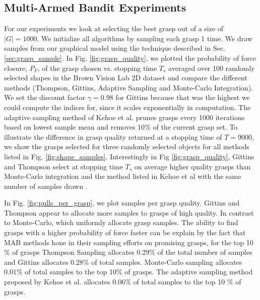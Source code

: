 \documentclass[journal,transmag]{IEEEtran}%
\begin{document}
\subsection{Multi-Armed Bandit Experiments}
For our experiments we look at selecting the best grasp out of a size of $|G| = 1000$. We initialize all algorithms by sampling each grasp 1 time. We draw samples from our graphical model using the technique described in Sec.  \ref{sec:grasp_sample}. In Fig. \ref{fig:grasp_quality}, we plotted the probability of force closure, $P_F$, of the grasp chosen vs. stopping time $T_s$ averaged over 100 randomly selected shapes in the Brown Vision Lab 2D dataset and compare the different methods (Thompson, Gittins, Adaptive Sampling \cite{kehoe2012toward} and Monte-Carlo Integration). We set the discount factor $\gamma =0.98$ for Gittins because that was the highest we could compute the indices for, since it scales exponentially in computation. The adaptive sampling method of Kehoe et al. prunes grasps every 1000 iterations based on lowest sample mean and removes 10$\%$ of the current grasp set.  To illustrate the difference in grasp quality returned at a stopping time of $T = 9000$,  we show the grasps selected for three randomly selected objects for all methods listed in Fig. \ref{fig:shape_samples}. Interestingly in Fig \ref{fig:grasp_quality}, Gittins and Thompson select at stopping time $T_s$ on average higher quality grasps than Monte-Carlo integration and the method listed in Kehoe et al \cite{kehoe2012toward} with the same number of samples drawn .

 In Fig. \ref{fig:pulls_per_grasp}, we plot samples per grasp quality. Gittins and Thompson appear to allocate  more samples to grasps of high quality. In contrast to Monte-Carlo, which uniformly allocate grasp samples. The ability to find grasps with a higher probability of force  faster can be explain by the fact that MAB methods hone in their sampling efforts on promising grasps, for the top 10$\%$ of grasps Thompson Sampling allocates 0.29$\%$ of the total number of samples and Gittins allocates 0.28$\%$ of total samples. Monte-Carlo sampling allocates $0.01\%$ of total samples to the top 10$\%$ of grasps. The adaptive sampling method proposed by Kehoe et al. allocates 0.06$\%$  of total samples to the top 10 $\%$ of grasps. 
\end{document}
